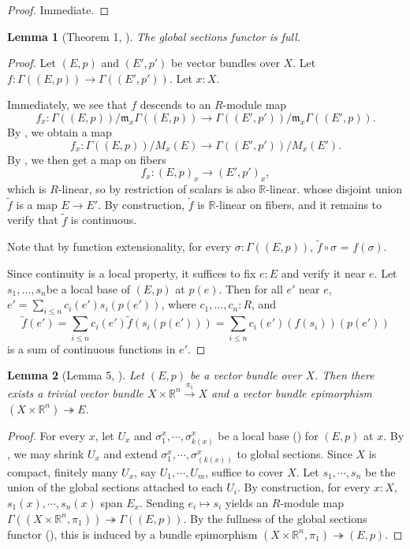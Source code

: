 \documentclass[11pt]{article}
\newcommand{\R}{\mathbb{R}}
\theoremstyle{plain}
\newtheorem{lemma}{Lemma}[section]
\theoremstyle{definition}
\begin{document}
\begin{proof}
  Immediate.
\end{proof}

\begin{lemma}[Theorem 1, \cite{swan1962vector}]\label{lemma:global-sections-full}
  The global sections functor is full.
\end{lemma}

\begin{proof}
  Let \((E,p)\) and \((E',p')\) be vector bundles over \(X\). Let \(f : \Gamma((E,p)) \to \Gamma((E',p'))\). Let \(x : X\).

  Immediately, we see that \(f\) descends to an \(R\)-module map \[f_x : \Gamma((E,p))/\mathfrak{m}_x \Gamma((E,p)) \to \Gamma((E',p'))/\mathfrak{m}_x \Gamma((E',p)).\]
  By , we obtain a map
  \[
f_x : \Gamma((E,p))/M_x(E) \to \Gamma((E',p'))/M_x(E').
\]
By , we then get a map on fibers
\[
f_x : (E,p)_x \to (E',p')_x,
\]
which is \(R\)-linear, so by restriction of scalars is also \(\R\)-linear.
whose disjoint union \(\widetilde{f}\) is a map \(E \to E'\). By construction, \(\widetilde{f}\) is \(\R\)-linear on fibers, and it remains to verify that \(\widetilde{f}\) is continuous.

Note that by function extensionality, for every \(\sigma : \Gamma((E,p))\), \(\widetilde{f} \circ \sigma\) = \(f (\sigma)\).

Since continuity is a local property, it suffices to fix \(e : E\) and verify it near \(e\). Let \(s_1, \dots, s_n\)be a local base of \((E,p)\) at \(p(e)\). Then for all \(e'\) near \(e\), \(e' = \sum_{i \leq n} c_i(e') s_i(p(e'))\), where \(c_1, \dots, c_n : R\), and
\[
  \widetilde{f}(e') = \sum_{i \leq n} c_i(e') \widetilde{f}(s_i(p(e'))) = \sum_{i \leq n} c_i(e') (f(s_i))(p(e'))
\]
is a sum of continuous functions in \(e'\).
\end{proof}

\begin{lemma}[Lemma 5, \cite{swan1962vector}]\label{lemma:free-resolution}
  Let \((E,p)\) be a vector bundle over \(X\). Then there exists a trivial vector bundle \(X \times \R^n \overset{\pi_1}{\to} X\) and a vector bundle epimorphism \((X \times \R^n) \twoheadrightarrow E\).
\end{lemma}

\begin{proof}
  For every \(x\), let \(U_x\) and \(\sigma^x_1, \cdots, \sigma^x_{k(x)}\) be a local base () for \((E,p)\) at \(x\). By , we may shrink \(U_x\) and extend \(\sigma^x_1, \cdots, \sigma^x_{(k(x))}\) to global sections. Since \(X\) is compact, finitely many \(U_x\), say \(U_1, \cdots, U_m\), suffice to cover \(X\). Let \(s_1, \cdots, s_n\) be the union of the global sections attached to each \(U_i\). By construction, for every \(x : X\), \(s_1(x), \cdots, s_n(x)\) span \(E_x\). Sending \(e_i \mapsto s_i\) yields an \(R\)-module map \(\Gamma((X \times \R^n, \pi_1)) \twoheadrightarrow \Gamma((E,p))\). By the fullness of the global sections functor (), this is induced by a bundle epimorphism \((X \times \R^n, \pi_1) \twoheadrightarrow (E,p)\).
\end{proof}
\end{document}
